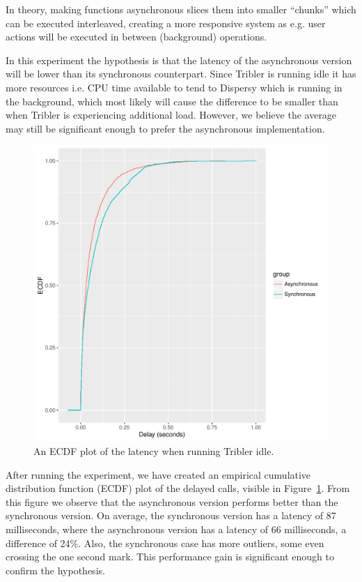 In theory, making functions asynchronous slices them into smaller \enquote{chunks} which can be executed interleaved, creating a more responsive system as e.g. user actions will be executed in between (background) operations.

In this experiment the hypothesis is that the latency of the asynchronous version will be lower than its synchronous counterpart.
Since Tribler is running idle it has more resources i.e. CPU time available to tend to Dispersy which is running in the background, which most likely will cause the difference to be smaller than when Tribler is experiencing additional load.
However, we believe the average may still be significant enough to prefer the asynchronous implementation.

\begin{figure}[!h]
	\centering
	\includegraphics[width=\linewidth]{experimentation/images/ecdf_latency_idle}
	\caption{An ECDF plot of the latency when running Tribler idle.}
	\label{fig:ecdf_latency_idle}
\end{figure} 

After running the experiment, we have created an empirical cumulative distribution function (ECDF) plot of the delayed calls, visible in Figure~\ref{fig:ecdf_latency_idle}.
From this figure we observe that the asynchronous version performs better than the synchronous version.
On average, the synchronous version has a latency of 87 milliseconds, where the asynchronous version has a latency of 66 milliseconds, a difference of 24\%.
Also, the synchronous case has more outliers, some even crossing the one second mark.
This performance gain is significant enough to confirm the hypothesis.

